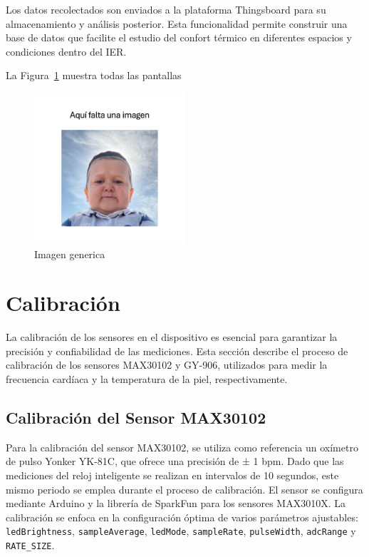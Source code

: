 \documentclass[
  letterpaper,
  DIV=11,
  numbers=noendperiod]{scrreport}
\begin{document}
Los datos recolectados son enviados a la plataforma Thingsboard para su
almacenamiento y análisis posterior. Esta funcionalidad permite
construir una base de datos que facilite el estudio del confort térmico
en diferentes espacios y condiciones dentro del IER.

La Figura~\ref{fig-generica} muestra todas las pantallas

\begin{figure}

{\centering \includegraphics[width=0.5\textwidth,height=\textheight]{Capitulos/../Imagenes/ImagenGenerica.png}

}

\caption{\label{fig-generica}Imagen generica}

\end{figure}

\hypertarget{sec-calibraciuxf3n}{%
\section{Calibración}\label{sec-calibraciuxf3n}}

La calibración de los sensores en el dispositivo es esencial para
garantizar la precisión y confiabilidad de las mediciones. Esta sección
describe el proceso de calibración de los sensores MAX30102 y GY-906,
utilizados para medir la frecuencia cardíaca y la temperatura de la
piel, respectivamente.

\hypertarget{calibraciuxf3n-del-sensor-max30102}{%
\subsection{Calibración del Sensor
MAX30102}\label{calibraciuxf3n-del-sensor-max30102}}

Para la calibración del sensor MAX30102, se utiliza como referencia un
oxímetro de pulso Yonker YK-81C, que ofrece una precisión de ± 1 bpm.
Dado que las mediciones del reloj inteligente se realizan en intervalos
de 10 segundos, este mismo periodo se emplea durante el proceso de
calibración. El sensor se configura mediante Arduino y la librería de
SparkFun para los sensores MAX3010X. La calibración se enfoca en la
configuración óptima de varios parámetros ajustables:
\texttt{ledBrightness}, \texttt{sampleAverage}, \texttt{ledMode},
\texttt{sampleRate}, \texttt{pulseWidth}, \texttt{adcRange} y
\texttt{RATE\_SIZE}.
\end{document}
